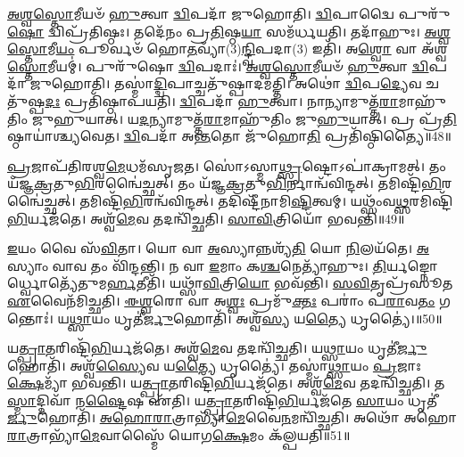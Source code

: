 \-\ul{𑌅}\-\-\ul{𑌶𑍍𑌵}\-\-\ul{𑌸𑍍𑌤𑍋}\-𑌮𑍀𑌯𑍞᳴ \ul{𑌹𑍁}\-𑌤𑍍𑌵𑌾 \ul{𑌦𑍍𑌵𑌿}\-𑌪𑌦𑌾᳴ 𑌜𑍁𑌹𑍋𑌤𑌿।
\-\ul{𑌦𑍍𑌵𑌿}\-𑌪𑌾𑌦𑍍𑌵𑍈 𑌪𑍁𑌰𑍁᳴\-\ul{𑌷𑍋} 𑌦𑍍𑌵𑌿𑌪𑍍𑌰᳴𑌤𑌿𑌷𑍍𑌠𑌃।
𑌤𑌦𑍇᳴𑌨𑌂 𑌪𑍍𑌰\-\ul{𑌤𑌿}\-𑌷𑍍𑌠\-\ul{𑌯𑌾} 𑌸𑌮᳴𑌰𑍍𑌧𑌯𑌤𑌿।
𑌤𑌦𑌾᳴𑌹𑍁𑌃।
\-\ul{𑌅}\-\-\ul{𑌶𑍍𑌵}\-\-\ul{𑌸𑍍𑌤𑍋}\-𑌮𑍀\-\ul{𑌯𑌂} 𑌪𑍂𑌰𑍍𑌵𑍞᳴ 𑌹𑍋\-\ul{𑌤}\-𑌵𑍍𑌯𑌾𑌁(3)\-\ul{𑌨𑍍𑌦𑍍𑌵𑌿}\-𑌪𑌦𑌾(3) 𑌇𑌤𑌿᳴।
𑌅\-\ul{𑌶𑍍𑌵𑍋} 𑌵𑌾 𑌅᳴𑌶𑍍𑌵\-\ul{𑌸𑍍𑌤𑍋}\-𑌮𑍀𑌯𑌮𑍍॑।
𑌪𑍁𑌰𑍁᳴𑌷𑍋 \ul{𑌦𑍍𑌵𑌿}\-𑌪𑌦𑌾𑌃॑।
\-\ul{𑌅}\-\-\ul{𑌶𑍍𑌵}\-\-\ul{𑌸𑍍𑌤𑍋}\-𑌮𑍀𑌯𑍞᳴ \ul{𑌹𑍁}\-𑌤𑍍𑌵𑌾 \ul{𑌦𑍍𑌵𑌿}\-𑌪𑌦𑌾᳴ 𑌜𑍁𑌹𑍋𑌤𑌿।
𑌤𑌸𑍍𑌮𑌾॑\-\ul{𑌦𑍍𑌦𑍍𑌵𑌿}\-𑌪𑌾𑌚𑍍𑌚𑌤𑍁᳴𑌷𑍍𑌪𑌾𑌦𑌮𑌤𑍍𑌤𑌿।
𑌅𑌥𑍋॑ \ul{𑌦𑍍𑌵𑌿}\-𑌪\-\ul{𑌦𑍍𑌯𑍇}\-𑌵 𑌚𑌤𑍁᳴𑌷𑍍𑌪\-\ul{𑌦𑌃} 𑌪𑍍𑌰𑌤𑌿᳴\-𑌷𑍍𑌠𑌾𑌪𑌯𑌤𑌿।
\-\ul{𑌦𑍍𑌵𑌿}\-𑌪𑌦𑌾᳴ \ul{𑌹𑍁}\-𑌤𑍍𑌵𑌾।
𑌨𑌾𑌨𑍍𑌯𑌾𑌮𑍁𑌤𑍍𑌤᳴\-\ul{𑌰𑌾}\-𑌮𑌾𑌹𑍁᳴𑌤𑌿𑌂 𑌜𑍁𑌹𑍁𑌯𑌾𑌤𑍍।
𑌯\-\ul{𑌦}\-𑌨𑍍𑌯𑌾𑌮𑍁𑌤𑍍𑌤᳴\-\ul{𑌰𑌾}\-𑌮𑌾𑌹𑍁᳴𑌤𑌿𑌂 𑌜𑍁\-\ul{𑌹𑍁}\-𑌯𑌾𑌤𑍍।
𑌪𑍍𑌰 𑌪𑍍𑌰᳴\-\ul{𑌤𑌿}\-𑌷𑍍𑌠𑌾𑌯𑌾॑𑌶𑍍𑌚𑍍𑌯𑌵𑍇𑌤।
\-\ul{𑌦𑍍𑌵𑌿}\-𑌪𑌦𑌾᳴ 𑌅\-\ul{𑌨𑍍𑌤}\-𑌤𑍋 𑌜𑍁᳴𑌹𑍋\-\ul{𑌤𑌿} 𑌪𑍍𑌰𑌤𑌿᳴\-𑌷𑍍𑌠𑌿𑌤𑍍𑌯𑍈॥48॥\anuvakamend[\-\ul{𑌬𑍃}\-\-\ul{𑌹}\-𑌤𑍍𑌯᳴𑌰𑍍𑌧𑌯𑌤𑌿 𑌸𑍍𑌥𑌾𑌪𑌯\-\ul{𑌤𑌿} 𑌪𑌞𑍍𑌚᳴ 𑌚]

\-\ul{𑌪𑍍𑌰}\-𑌜𑌾𑌪᳴𑌤𑌿𑌰𑌶𑍍𑌵\-\ul{𑌮𑍇}\-𑌧𑌮᳴\-𑌸𑍃𑌜𑌤।
𑌸𑍋॑𑌽𑌸𑍍𑌮𑌾\-\ul{𑌥𑍍𑌸𑍃}\-𑌷𑍍𑌟𑍋\-𑌽𑌪𑌾॑𑌕𑍍𑌰𑌾𑌮𑌤𑍍।
𑌤𑌂 𑌯᳴𑌜𑍍𑌞\-\-\ul{𑌕𑍍𑌰}\-𑌤𑍁\-\ul{𑌭𑌿}\-𑌰𑌨𑍍𑌵𑍈॑𑌚𑍍𑌛𑌤𑍍।
𑌤𑌂 𑌯᳴𑌜𑍍𑌞\-\-\ul{𑌕𑍍𑌰}\-𑌤𑍁\-\ul{𑌭𑌿}\-𑌰𑍍𑌨𑌾𑌨𑍍𑌵᳴𑌵𑌿𑌨𑍍𑌦𑌤𑍍।
𑌤𑌮𑌿𑌷𑍍𑌟𑌿᳴\-\ul{𑌭𑌿}\-𑌰𑌨𑍍𑌵𑍈॑𑌚𑍍𑌛𑌤𑍍।
𑌤𑌮𑌿𑌷𑍍𑌟𑌿᳴\-\ul{𑌭𑌿}\-𑌰𑌨𑍍𑌵᳴𑌵𑌿𑌨𑍍𑌦𑌤𑍍।
𑌤𑌦𑌿𑌷𑍍𑌟𑍀᳴𑌨𑌾𑌮𑌿\-\ul{𑌷𑍍𑌟𑌿}\-\-𑌤𑍍𑌵𑌮𑍍।
𑌯𑌥𑍍𑌸𑌂᳴𑌵\-\ul{𑌥𑍍𑌸}\-𑌰𑌮𑌿𑌷𑍍𑌟𑌿᳴\-\-\ul{𑌭𑌿}\-𑌰𑍍𑌯𑌜᳴𑌤𑍇।
𑌅𑌶𑍍𑌵᳴\-\ul{𑌮𑍇}\-𑌵 𑌤𑌦𑌨𑍍𑌵𑌿᳴𑌚𑍍𑌛𑌤𑌿।
\-\ul{𑌸𑌾}\-\-\ul{𑌵𑌿}\-𑌤𑍍𑌰𑌿𑌯𑍋᳴ 𑌭𑌵𑌨𑍍𑌤𑌿॥49॥

\-\ul{𑌇}\-𑌯𑌂 𑌵𑍈 𑌸᳴\-\ul{𑌵𑌿}\-𑌤𑌾।
𑌯𑍋 𑌵𑌾 \ul{𑌅}\-𑌸𑍍𑌯𑌾𑌨𑍍𑌨𑌶𑍍𑌯᳴\-\ul{𑌤𑌿} 𑌯𑍋 \ul{𑌨𑌿}\-𑌲𑌯᳴𑌤𑍇।
\-\ul{𑌅}\-𑌸𑍍𑌯𑌾𑌂 𑌵𑌾𑌵 𑌤𑌂 𑌵𑌿᳴𑌨𑍍𑌦𑌨𑍍𑌤𑌿।
𑌨 𑌵𑌾 \ul{𑌇}\-𑌮𑌾𑌂 𑌕\-\ul{𑌶𑍍𑌚}\-𑌨𑍇𑌤𑍍𑌯𑌾᳴𑌹𑍁𑌃।
\-\ul{𑌤𑌿}\-𑌰𑍍𑌯𑌙𑍍𑌨𑍋𑌰𑍍𑌧𑍍𑌵𑍋𑌤𑍍𑌯𑍇᳴𑌤𑍁𑌮\-\ul{𑌰𑍍𑌹}\-𑌤𑍀𑌤𑌿᳴।
𑌯𑌥𑍍𑌸𑌾᳴\-\ul{𑌵𑌿}\-𑌤𑍍𑌰𑌿\-\ul{𑌯𑍋} 𑌭𑌵᳴𑌨𑍍𑌤𑌿।
\-\ul{𑌸}\-\-\ul{𑌵𑌿}\-𑌤𑍃\-𑌪𑍍𑌰᳴𑌸𑍂𑌤 \ul{𑌏}\-𑌵𑍈𑌨᳴𑌮𑌿𑌚𑍍𑌛𑌤𑌿।
\-\ul{𑌈}\-\-\ul{𑌶𑍍𑌵}\-𑌰𑍋 𑌵𑌾 𑌅\-\ul{𑌶𑍍𑌵𑌃} 𑌪𑍍𑌰𑌮𑍁᳴\-\ul{𑌕𑍍𑌤𑌃} 𑌪𑌰𑌾𑌂॑ 𑌪\-\ul{𑌰𑌾}\-𑌵\-\ul{𑌤𑌂} 𑌗𑌨𑍍𑌤𑍋𑌃॑।
𑌯\-\ul{𑌥𑍍𑌸𑌾}\-𑌯𑌂 𑌧𑍃𑌤𑍀॑\-\ul{𑌰𑍍𑌜𑍁}\-𑌹𑍋𑌤𑌿᳴।
𑌅𑌶𑍍𑌵᳴\-\ul{𑌸𑍍𑌯} 𑌯\-\ul{𑌤𑍍𑌯𑍈} 𑌧𑍃𑌤𑍍𑌯𑍈॑।॥50॥

𑌯\-\ul{𑌤𑍍𑌪𑍍𑌰𑌾}\-𑌤𑌰𑌿𑌷𑍍𑌟𑌿᳴\-\ul{𑌭𑌿}\-𑌰𑍍𑌯𑌜᳴𑌤𑍇।
𑌅𑌶𑍍𑌵᳴\-\ul{𑌮𑍇}\-𑌵 𑌤𑌦𑌨𑍍𑌵𑌿᳴𑌚𑍍𑌛𑌤𑌿।
𑌯\-\ul{𑌥𑍍𑌸𑌾}\-𑌯𑌂 𑌧𑍃𑌤𑍀॑\-\ul{𑌰𑍍𑌜𑍁}\-𑌹𑍋𑌤𑌿᳴।
𑌅𑌶𑍍𑌵᳴\-\ul{𑌸𑍍𑌯𑍈}\-𑌵 𑌯\-\ul{𑌤𑍍𑌯𑍈} 𑌧𑍃𑌤𑍍𑌯𑍈॑।
𑌤𑌸𑍍𑌮𑌾॑\-\ul{𑌥𑍍𑌸𑌾}\-𑌯𑌂 \ul{𑌪𑍍𑌰}\-𑌜𑌾𑌃 \ul{𑌕𑍍𑌷𑍇}\-𑌮𑍍𑌯𑌾᳴ 𑌭𑌵𑌨𑍍𑌤𑌿।
𑌯\-\ul{𑌤𑍍𑌪𑍍𑌰𑌾}\-𑌤𑌰𑌿𑌷𑍍𑌟𑌿᳴\-\ul{𑌭𑌿}\-𑌰𑍍𑌯𑌜᳴𑌤𑍇।
𑌅𑌶𑍍𑌵᳴\-\ul{𑌮𑍇}\-𑌵 𑌤𑌦𑌨𑍍𑌵𑌿᳴𑌚𑍍𑌛𑌤𑌿।
𑌤\-\ul{𑌸𑍍𑌮𑌾}\-𑌦𑍍𑌦𑌿𑌵𑌾᳴ 𑌨\-\ul{𑌷𑍍𑌟𑍈}\-𑌷 𑌏᳴𑌤𑌿।
𑌯\-\ul{𑌤𑍍𑌪𑍍𑌰𑌾}\-𑌤𑌰𑌿𑌷𑍍𑌟𑌿᳴\-\ul{𑌭𑌿}\-𑌰𑍍𑌯𑌜᳴𑌤𑍇 \ul{𑌸𑌾}\-𑌯𑌂 𑌧𑍃𑌤𑍀॑\-\ul{𑌰𑍍𑌜𑍁}\-𑌹𑍋𑌤𑌿᳴।
\-\ul{𑌅}\-\-\ul{𑌹𑍋}\-\-\ul{𑌰𑌾}\-𑌤𑍍𑌰𑌾𑌭𑍍𑌯𑌾᳴\-\ul{𑌮𑍇}\-𑌵𑍈\-\ul{𑌨}\-𑌮𑌨𑍍𑌵𑌿᳴𑌚𑍍𑌛𑌤𑌿।
𑌅𑌥𑍋᳴ 𑌅𑌹𑍋\-\ul{𑌰𑌾}\-𑌤𑍍𑌰𑌾𑌭𑍍𑌯𑌾᳴\-\ul{𑌮𑍇}\-𑌵𑌾𑌸𑍍𑌮𑍈᳴ 𑌯𑍋𑌗\-\ul{𑌕𑍍𑌷𑍇}\-𑌮𑌂 𑌕᳴𑌲𑍍𑌪𑌯𑌤𑌿॥51॥\anuvakamend[\-\ul{𑌭}\-\-\ul{𑌵}\-\-\ul{𑌨𑍍𑌤𑌿} 𑌧𑍃𑌤𑍍𑌯𑌾᳴ 𑌏\-\ul{𑌨}\-𑌮𑌨𑍍𑌵𑌿᳴\-\ul{𑌚𑍍𑌛}\-𑌤𑍍𑌯𑍇𑌕𑌂᳴ 𑌚]

